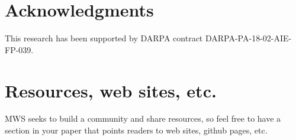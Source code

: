 \documentclass[11pt]{article}
\begin{document}
\section{Acknowledgments}

This research has been supported by DARPA contract DARPA-PA-18-02-AIE-FP-039.

\section{Resources, web sites, etc.}

MWS seeks to build a community and share resources, so feel free to have a section in your paper that points readers to web sites, github pages, etc.



\end{document}
